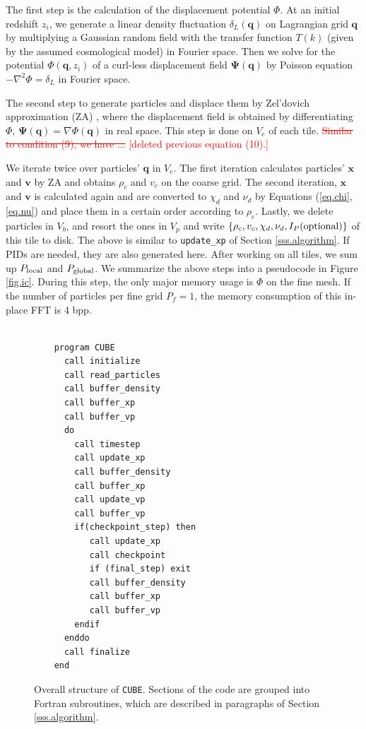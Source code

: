 \documentclass[10pt,twocolumn,preprint]{emulateapj}
\newcommand{\bs}{\boldsymbol}
\newcommand{\tcr}{\textcolor{red}}
\begin{document}
The first step is the calculation of the displacement potential $\Phi$. At an initial redshift $z_i$, we generate a linear density fluctuation $\delta_L({\bs q})$ on Lagrangian grid ${\bs q}$ by multiplying a Gaussian random field with the transfer function $T(k)$ (given by the assumed cosmological model) in Fourier space. Then we solve for the potential ${\Phi({\bs q}, z_i)}$ of a curl-less displacement field ${\bs\Psi({\bs q})}$ by Poisson equation $-\nabla^2\Phi=\delta_L$ in Fourier space.

The second step to generate particles and displace them by Zel'dovich approximation (ZA) \citep{1970A&A.....5...84Z}, where the displacement field is obtained by differentiating $\Phi$, ${\bs \Psi}({\bs q})=\nabla\Phi({\bs q})$ in real space. This step is done on $V_e$ of each tile. \tcr{\sout{Similar to condition (9), we have ...} [deleted previous equation (10).]}

We iterate twice over particles' ${\bs q}$ in $V_e$. The first iteration calculates particles' ${\bs x}$ and ${\bs v}$ by ZA and obtains $\rho_c$ and $v_c$ on the coarse grid. The second iteration, ${\bs x}$ and ${\bs v}$ is calculated again and are converted to $\chi_d$ and $\nu_d$ by Equations (\ref{eq.chi},\ref{eq.nu}) and place them in a certain order according to $\rho_c$. Lastly, we delete particles in $V_b$, and resort the ones in $V_p$ and write $\{\rho_c,v_c,\chi_d,\nu_d,I_P({\rm optional})\}$ of this tile to disk. The above is similar to {\tt update\_xp} of Section \ref{sss.algorithm}. If PIDs are needed, they are also generated here.
After working on all tiles, we sum up $P_{\rm local}$ and $P_{\rm global}$. We summarize the above steps into a pseudocode in Figure \ref{fig.ic}. During this step, the only major memory usage is $\Phi$ on the fine mesh. If the number of particles per fine grid $P_f=1$, the memory consumption of this in-place FFT is 4 bpp.


\begin{figure}[]
\begin{verbatim}

    program CUBE
      call initialize
      call read_particles
      call buffer_density
      call buffer_xp
      call buffer_vp
      do
        call timestep
        call update_xp
        call buffer_density
        call buffer_xp
        call update_vp
        call buffer_vp
        if(checkpoint_step) then
           call update_xp
           call checkpoint
           if (final_step) exit
           call buffer_density
           call buffer_xp
           call buffer_vp
        endif
      enddo
      call finalize
    end
\end{verbatim}
\caption{Overall structure of {\tt CUBE}. Sections of the code are grouped into Fortran subroutines, which are described in paragraphs of Section \ref{sss.algorithm}.}
\label{fig.code}
\end{figure}
\end{document}

